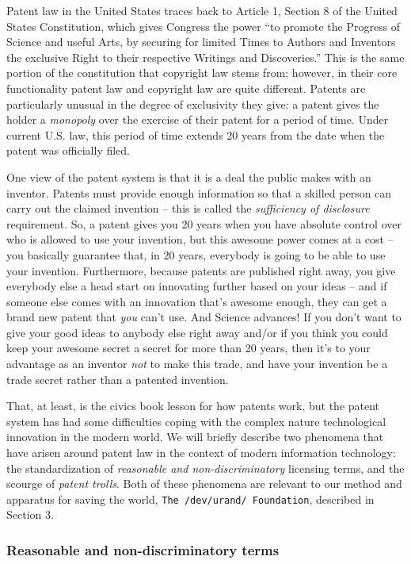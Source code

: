 \documentclass[acmtocl]%
{boviktrans}
\begin{document}
Patent law in the United States traces back to Article 1, Section 8 of
the United States Constitution, which gives Congress the power ``to
promote the Progress of Science and useful Arts, by securing for
limited Times to Authors and Inventors the exclusive Right to their
respective Writings and Discoveries.'' This is the same portion of the
constitution that copyright law stems from; however, in their core
functionality patent law and copyright law are quite
different. Patents are particularly unusual in the degree of
exclusivity they give: a patent gives the holder a {\it monopoly} over
the exercise of their patent for a period of time. Under current U.S.
law, this period of time extends 20 years from the date when the
patent was officially filed.

One view of the patent system is that it is a deal the public makes
with an inventor. Patents must provide enough information so that a
skilled person can carry out the claimed invention -- this is called
the {\it sufficiency of disclosure} requirement.  So, a patent gives
you 20 years when you have absolute control over who is allowed to use
your invention, but this awesome power comes at a cost -- you
basically guarantee that, in 20 years, everybody is going to be able
to use your invention. Furthermore, because patents are published
right away, you give everybody else a head start on innovating further
based on your ideas -- and if someone else comes with an innovation
that's awesome enough, they can get a brand new patent that {\it you}
can't use. And Science advances!  If you don't want to give your good
ideas to anybody else right away and/or if you think you could keep
your awesome secret a secret for more than 20 years, then it's to your
advantage as an inventor {\it not} to make this trade, and have your
invention be a trade secret rather than a patented invention.

That, at least, is the civics book lesson for how patents work, but
the patent system has had some difficulties coping with the complex
nature technological innovation in the modern world. We will briefly
describe two phenomena \cite{dododododod} that have arisen around
patent law in the context of modern information technology: the
standardization of {\it reasonable and non-discriminatory} licensing
terms, and the scourge of {\it patent trolls}. Both of these phenomena
\cite{dododododod} are relevant to our method and apparatus for saving
the world, {\tt The /dev/urand/ Foundation}, described in Section 3.

\subsubsection{Reasonable and non-discriminatory terms}
\end{document}
